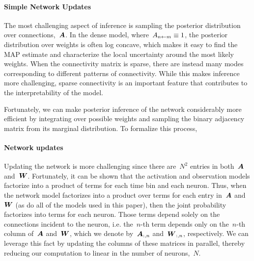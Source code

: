 \paragraph{Simple Network Updates}
The most challenging aspect of inference is sampling the
posterior distribution over connections,~$\boldsymbol{A}$. In the
dense model, where~$A_{n \leftarrow m} \equiv 1$, the posterior
distribution over weights is often log concave, which
makes it easy to find the MAP estimate and characterize
the local uncertainty around the most likely weights.
When the connectivity matrix is sparse, there are instead
many modes corresponding to different patterns of
connectivity. While this makes inference more challenging,
sparse connectivity is an important feature that
contributes to the interpretability of the model.

Fortunately, we can make posterior inference of the
network considerably more efficient by integrating over
possible weights and sampling the binary adjacency
matrix from its marginal distribution. To formalize
this process, 

\paragraph{Network updates} Updating the network is more challenging since there are~$N^2$ entries in both~$\boldsymbol{A}$ and~$\boldsymbol{W}$. 
Fortunately, it can be shown that the activation and observation models factorize into a product of terms for each time bin and each neuron.
Thus, when the network model factorizes into a product over terms for each entry in~$\boldsymbol{A}$ and~$\boldsymbol{W}$ (as do all of the models used in this paper), then the joint probability factorizes into terms for each neuron. 
Those terms depend solely on the connections incident to the neuron, i.e. the~$n$-th term depends only on the~$n$-th column of~$\boldsymbol{A}$ and~$\boldsymbol{W}$, which we denote by~$\boldsymbol{A}_{:,n}$ and~$\boldsymbol{W}_{:,n}$, respectively.
We can leverage this fact by updating the columns of these matrices in parallel, thereby reducing our computation to linear in the number of neurons,~$N$.

